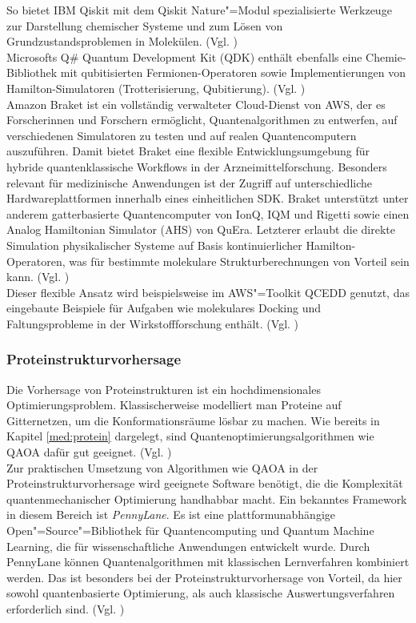 So bietet IBM Qiskit mit dem Qiskit Nature"=Modul spezialisierte Werkzeuge zur Darstellung chemischer Systeme und zum Lösen von Grundzustandsproblemen in Molekülen. (Vgl. \cite{noauthor_qiskit_2022})\\

Microsofts Q\# Quantum Development Kit (QDK) enthält ebenfalls eine Chemie-Bibliothek mit qubitisierten Fermionen-Operatoren sowie Implementierungen von Hamilton-Simulatoren (Trotterisierung, Qubitierung). (Vgl. \cite{msazure}) \\

Amazon Braket ist ein vollständig verwalteter Cloud-Dienst von AWS, der es Forscherinnen und Forschern ermöglicht, Quantenalgorithmen zu entwerfen, auf verschiedenen Simulatoren zu testen und auf realen Quantencomputern auszuführen. Damit bietet Braket eine flexible Entwicklungsumgebung für hybride quantenklassische Workflows in der Arzneimittelforschung. Besonders relevant für medizinische Anwendungen ist der Zugriff auf unterschiedliche Hardwareplattformen innerhalb eines einheitlichen SDK. Braket unterstützt unter anderem gatterbasierte Quantencomputer von IonQ, IQM und Rigetti sowie einen Analog Hamiltonian Simulator (AHS) von QuEra. Letzterer erlaubt die direkte Simulation physikalischer Systeme auf Basis kontinuierlicher Hamilton-Operatoren, was für bestimmte molekulare Strukturberechnungen von Vorteil sein kann. (Vgl. \cite{amazonbraket})\\

Dieser flexible Ansatz wird beispielsweise im AWS"=Toolkit QCEDD genutzt, das eingebaute Beispiele für Aufgaben wie molekulares Docking und Faltungsprobleme in der Wirkstoffforschung enthält. (Vgl. \cite{amazonscience})\\ %


\subsubsection*{Proteinstrukturvorhersage}
Die Vorhersage von Proteinstrukturen ist ein hochdimensionales Optimierungsproblem. Klassischerweise modelliert man Proteine auf Gitternetzen, um die Konformationsräume lösbar zu machen. Wie bereits in Kapitel \ref{med:protein} dargelegt, sind Quantenoptimierungsalgorithmen wie QAOA dafür gut geeignet. (Vgl. \cite{boulebnane})\\

Zur praktischen Umsetzung von Algorithmen wie QAOA in der Proteinstrukturvorhersage wird geeignete Software benötigt, die die Komplexität quantenmechanischer Optimierung handhabbar macht. Ein bekanntes Framework in diesem Bereich ist \textit{PennyLane}. Es ist eine plattformunabhängige Open"=Source"=Bibliothek für Quantencomputing und Quantum Machine Learning, die für wissenschaftliche Anwendungen entwickelt wurde. Durch PennyLane können Quantenalgorithmen mit klassischen Lernverfahren kombiniert werden. Das ist besonders bei der Proteinstrukturvorhersage von Vorteil, da hier sowohl quantenbasierte Optimierung, als auch klassische Auswertungsverfahren erforderlich sind. (Vgl. \cite{PennyLane})\\


